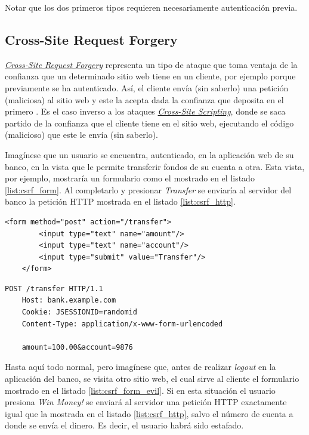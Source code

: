 \documentclass[a4paper,12pt,twoside,openright]{report}
\begin{document}
	Notar que los dos primeros tipos requieren necesariamente autenticación previa.
	
	\subsection{Cross-Site Request Forgery}
	\href{https://en.wikipedia.org/wiki/Cross-site_request_forgery}{\emph{Cross-Site Request Forgery}} representa un tipo de ataque que toma ventaja de la confianza que un determinado sitio web tiene en un cliente, por ejemplo porque previamente se ha autenticado. Así, el cliente envía (sin saberlo) una petición (maliciosa) al sitio web y este la acepta dada la confianza que deposita en el primero \cite{Alex2020}. Es el caso inverso a los ataques \href{https://owasp.org/www-community/attacks/xss/}{\emph{Cross-Site Scripting}}, donde se saca partido de la confianza que el cliente tiene en el sitio web, ejecutando el código (malicioso) que este le envía (sin saberlo).
	
	Imagínese que un usuario se encuentra, autenticado, en la aplicación web de su banco, en la vista que le permite transferir fondos de su cuenta a otra. Esta vista, por ejemplo, mostraría un formulario como el mostrado en el listado \ref{list:csrf_form}. Al completarlo y presionar \emph{Transfer} se enviaría al servidor del banco la petición HTTP mostrada en el listado \ref{list:csrf_http}.
	\\
	
	\begin{lstlisting}[caption=Formulario inseguro para la transferencia de fondos,label=list:csrf_form]
	<form method="post" action="/transfer">
		<input type="text" name="amount"/>
		<input type="text" name="account"/>
		<input type="submit" value="Transfer"/>
	</form>
	\end{lstlisting}
	
	\begin{lstlisting}[caption=Petición HTTP insegura para la transferencia de fondos,label=list:csrf_http]
	POST /transfer HTTP/1.1
	Host: bank.example.com
	Cookie: JSESSIONID=randomid
	Content-Type: application/x-www-form-urlencoded
	
	amount=100.00&account=9876
	\end{lstlisting}
	
	Hasta aquí todo normal, pero imagínese que, antes de realizar \emph{logout} en la aplicación del banco, se visita otro sitio web, el cual sirve al cliente el formulario mostrado en el listado \ref{list:csrf_form_evil}. Si en esta situación el usuario presiona \emph{Win Money!} se enviará al servidor una petición HTTP exactamente igual que la mostrada en el listado \ref{list:csrf_http}, salvo el número de cuenta a donde se envía el dinero. Es decir, el usuario habrá sido estafado.
	\\
	
\end{document}

